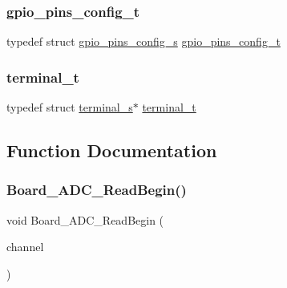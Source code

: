 \mbox{\label{group__hal_ga7eca1221f3682873bc58bc23f56ab861}} 
\subsubsection{\texorpdfstring{gpio\+\_\+pins\+\_\+config\+\_\+t}{gpio\_pins\_config\_t}}
{\footnotesize\ttfamily typedef struct \hyperlink{structgpio__pins__config__s}{gpio\+\_\+pins\+\_\+config\+\_\+s}  \hyperlink{group__hal_ga7eca1221f3682873bc58bc23f56ab861}{gpio\+\_\+pins\+\_\+config\+\_\+t}}

\mbox{\label{group__hal_ga64d2a4cb83c256a6ace36ce64935997f}} 
\subsubsection{\texorpdfstring{terminal\+\_\+t}{terminal\_t}}
{\footnotesize\ttfamily typedef struct \hyperlink{structterminal__s}{terminal\+\_\+s}$\ast$  \hyperlink{group__hal_ga64d2a4cb83c256a6ace36ce64935997f}{terminal\+\_\+t}}



\subsection{Function Documentation}
\mbox{\label{group__hal_ga8cc33a8b61c622ac85ae3740a121100b}} 
\subsubsection{\texorpdfstring{Board\+\_\+\+A\+D\+C\+\_\+\+Read\+Begin()}{Board\_ADC\_ReadBegin()}}
{\footnotesize\ttfamily void Board\+\_\+\+A\+D\+C\+\_\+\+Read\+Begin (\begin{DoxyParamCaption}\item[{\hyperlink{group___a_d_c__18_x_x__43_x_x_ga30ee7058bc7cc1daff718b29b42bed4e}{A\+D\+C\+\_\+\+C\+H\+A\+N\+N\+E\+L\+\_\+T}}]{channel }\end{DoxyParamCaption})}



